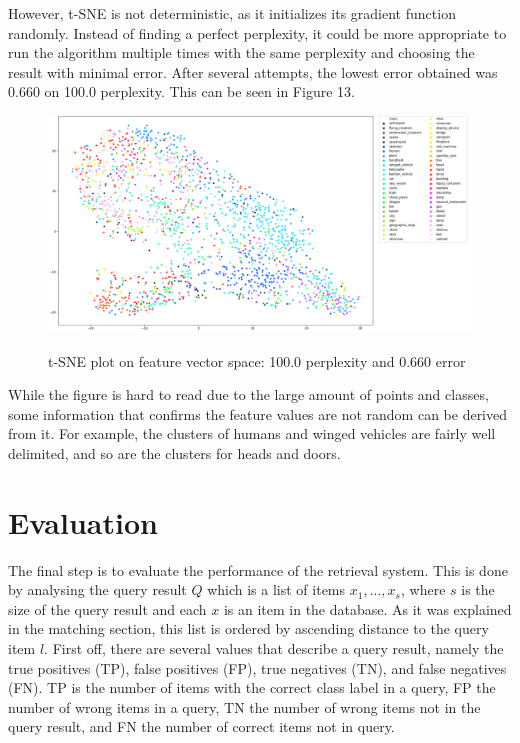 \documentclass{bigdata}
\begin{document}
However, t-SNE is not deterministic, as it initializes its gradient function randomly. Instead of finding a perfect perplexity, it could be more appropriate to run the algorithm multiple times with the same perplexity and choosing the result with minimal error. After several attempts, the lowest error obtained was 0.660 on 100.0 perplexity. This can be seen in Figure 13. \\
\begin{figure}[!h]
	\includegraphics[width=1\linewidth]{Pictures/perp100err0-660.png}
	\label{fig:fig1}
	\caption{t-SNE plot on feature vector space: 100.0 perplexity and 0.660 error}
\end{figure}

\noindent While the figure is hard to read due to the large amount of points and classes, some information that confirms the feature values are not random can be derived from it. For example, the clusters of humans and winged vehicles are fairly well delimited, and so are the clusters for heads and doors.

\section{Evaluation}
The final step is to evaluate the performance of the retrieval system. This is done by analysing the query result $Q$ which is a list of items ${x_1,...,x_s}$, where $s$ is the size of the query result and each $x$ is an item in the database. As it was explained in the matching section, this list is ordered by ascending distance to the query item $l$. First off, there are several values that describe a query result, namely the true positives (TP), false positives (FP), true negatives (TN), and false negatives (FN). TP is the number of items with the correct class label in a query, FP the number of wrong items in a query, TN the number of wrong items not in the query result, and FN the number of correct items not in query.
\end{document}
